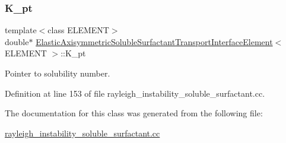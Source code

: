 \subsubsection{\texorpdfstring{K\+\_\+pt}{K\_pt}}
{\footnotesize\ttfamily template$<$class E\+L\+E\+M\+E\+NT$>$ \\
double$\ast$ \hyperlink{classElasticAxisymmetricSolubleSurfactantTransportInterfaceElement}{Elastic\+Axisymmetric\+Soluble\+Surfactant\+Transport\+Interface\+Element}$<$ E\+L\+E\+M\+E\+NT $>$\+::K\+\_\+pt\hspace{0.3cm}{\ttfamily [private]}}



Pointer to solubility number. 



Definition at line 153 of file rayleigh\+\_\+instability\+\_\+soluble\+\_\+surfactant.\+cc.



The documentation for this class was generated from the following file\+:\begin{DoxyCompactItemize}
\item 
\hyperlink{rayleigh__instability__soluble__surfactant_8cc}{rayleigh\+\_\+instability\+\_\+soluble\+\_\+surfactant.\+cc}\end{DoxyCompactItemize}
